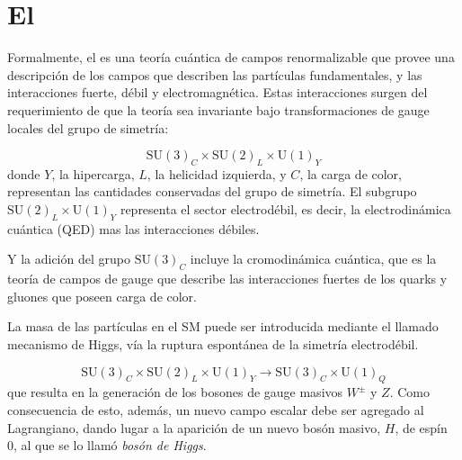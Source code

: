 \section{El \SM}

Formalmente, el {\SM} es una teoría cuántica de campos renormalizable que provee
una descripción de los campos que describen las partículas fundamentales, y las
interacciones fuerte, débil y electromagnética.
Estas interacciones surgen del requerimiento de que la teoría sea invariante
bajo transformaciones de gauge locales del grupo de simetría:

\begin{equation}
  \text{SU}(3)_C \times \text{SU}(2)_L \times \text{U}(1)_Y
\end{equation}
%
donde $Y$, la hipercarga, $L$, la helicidad izquierda, y $C$, la carga de color,
representan las cantidades conservadas del grupo de simetría. El subgrupo
$\text{SU}(2)_L \times \text{U}(1)_Y$ representa el sector electrodébil, es
decir, la electrodinámica cuántica (QED) mas las interacciones débiles.


Y la adición del grupo $\text{SU}(3)_C$ incluye la cromodinámica cuántica, que
es la teoría de campos de gauge que describe las interacciones fuertes de los
quarks y gluones que poseen carga de color.

La masa de las partículas en el SM puede ser introducida mediante el llamado
mecanismo de Higgs\cite{PhysRevLett.13.321, PhysRevLett.13.508}, vía la ruptura
espontánea de la simetría electrodébil.

\begin{equation}
  \text{SU}(3)_C \times \text{SU}(2)_L \times \text{U}(1)_Y \to \text{SU}(3)_C
  \times \text{U}(1)_Q
\end{equation}
%
que resulta en la generación de los bosones de gauge masivos $W^\pm$ y $Z$. Como
consecuencia de esto, además, un nuevo campo escalar debe ser agregado al
Lagrangiano, dando lugar a la aparición de un nuevo bosón masivo, $H$, de espín
0, al que se lo llamó \emph{bosón de Higgs}.

